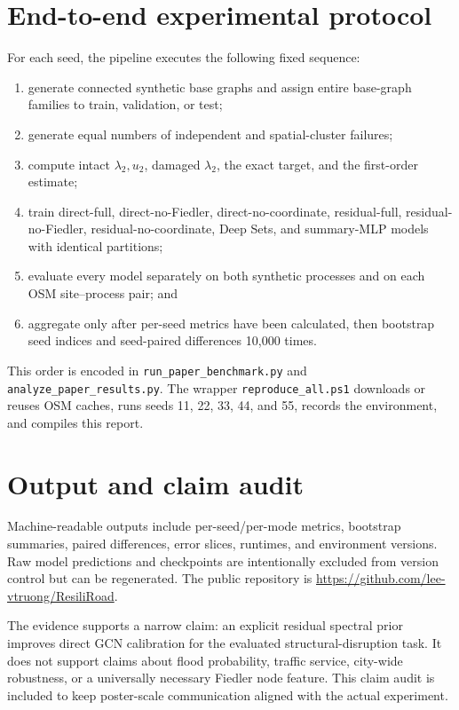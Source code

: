 \documentclass[11pt]{amsart}
\begin{document}
\section{End-to-end experimental protocol}
For each seed, the pipeline executes the following fixed sequence:
\begin{enumerate}
\item generate connected synthetic base graphs and assign entire base-graph
families to train, validation, or test;
\item generate equal numbers of independent and spatial-cluster failures;
\item compute intact $\lambda_2,u_2$, damaged $\lambda_2$, the exact target,
and the first-order estimate;
\item train direct-full, direct-no-Fiedler, direct-no-coordinate,
residual-full, residual-no-Fiedler, residual-no-coordinate, Deep Sets, and
summary-MLP models with identical partitions;
\item evaluate every model separately on both synthetic processes and on each
OSM site--process pair; and
\item aggregate only after per-seed metrics have been calculated, then
bootstrap seed indices and seed-paired differences 10,000 times.
\end{enumerate}
This order is encoded in \texttt{run\_paper\_benchmark.py} and
\texttt{analyze\_paper\_results.py}. The wrapper
\texttt{reproduce\_all.ps1} downloads or reuses OSM caches, runs seeds 11, 22,
33, 44, and 55, records the environment, and compiles this report.

\section{Output and claim audit}
Machine-readable outputs include per-seed/per-mode metrics, bootstrap summaries,
paired differences, error slices, runtimes, and environment versions. Raw model
predictions and checkpoints are intentionally excluded from version control but
can be regenerated. The public repository is
\href{https://github.com/lee-vtruong/ResiliRoad}{https://github.com/lee-vtruong/ResiliRoad}.

The evidence supports a narrow claim: an explicit residual spectral prior
improves direct GCN calibration for the evaluated structural-disruption task.
It does not support claims about flood probability, traffic service, city-wide
robustness, or a universally necessary Fiedler node feature. This claim audit is
included to keep poster-scale communication aligned with the actual experiment.
\end{document}
